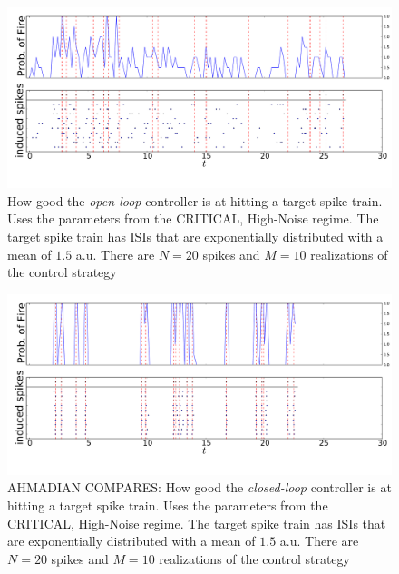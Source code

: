 \documentclass{article}
\begin{document}
\begin{figure}[htp]     
\begin{center}  
  \includegraphics[width=.99\textwidth]{Figs/TrainController/CRITHN_ol_trains_sim_10.pdf}
  \caption[ ]{How good the {\sl open-loop} controller is at hitting a target
  spike train. Uses the parameters from the CRITICAL, High-Noise regime. The
  target spike train has ISIs that are exponentially distributed with a
  mean of $1.5$ a.u. There are $N=20$ spikes and $M=10$ realizations of the
  control strategy}
  \label{fig:targettrain_ol_critlownoise}   
\end{center}
\end{figure}
\begin{figure}[htp]     
\begin{center}  
  \includegraphics[width=.99\textwidth]{Figs/TrainController/CRITLN_Ahmadian_cl_trains_sim_10.pdf}
  \caption[ ]{AHMADIAN COMPARES: How good the {\sl closed-loop} controller is at
  hitting a target spike train. Uses the parameters from the CRITICAL, High-Noise regime. The
  target spike train has ISIs that are exponentially distributed with a
  mean of $1.5$ a.u. There are $N=20$ spikes and $M=10$ realizations of the
  control strategy}
  \label{fig:targettrain_cl_critlownoise}  
\end{center}
\end{figure}   
\end{document}
